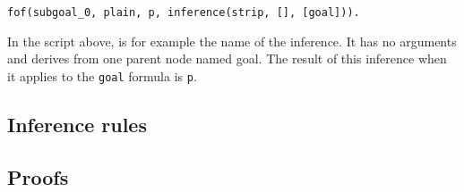 \documentclass[../main.tex]{subfiles}
\begin{document}
\begin{verbatim}
fof(subgoal_0, plain, p, inference(strip, [], [goal])).
\end{verbatim}

In the script above, \strip is for example the name of the inference.
It has no arguments and derives from one parent node named goal. The
result of this inference when it applies to the \verb!goal! formula is
\verb!p!.


\subsection{Inference rules}
\label{ssec:metis-inferences-rules}




\subsection{Proofs}
\label{ssec:metis-proofs}
\end{document}
